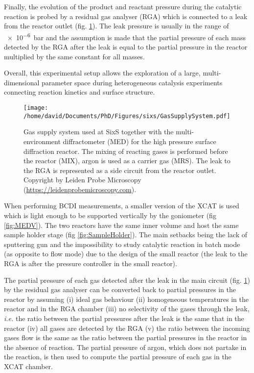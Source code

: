 Finally, the evolution of the product and reactant pressure during the catalytic reaction is probed by a residual gas analyser (RGA) which is connected to a leak from the reactor outlet (fig. \ref{fig:GasSupplySystem}).
The leak pressure is usually in the range of \qty{e-6}{\bar} and the assumption is made that the partial pressure of each mass detected by the RGA after the leak is equal to the partial pressure in the reactor multiplied by the same constant for all masses.

Overall, this experimental setup allows the exploration of a large, multi-dimensional parameter space during heterogeneous catalysis experiments connecting reaction kinetics and surface structure.

\begin{figure}[!htb]
    \centering
    \texttt{[image: /home/david/Documents/PhD/Figures/sixs/GasSupplySystem.pdf]}
    \caption{
    	Gas supply system used at SixS together with the multi-environment diffractometer (MED) for the high pressure surface diffraction reactor.
    	The mixing of reacting gases is performed before the reactor (MIX), argon is used as a carrier gas (MRS).
    	The leak to the RGA is represented as a side circuit from the reactor outlet.
    	Copyright by Leiden Probe Microscopy (\url{https://leidenprobemicroscopy.com}).
    }
    \label{fig:GasSupplySystem}
\end{figure}

When performing BCDI measurements, a smaller version of the XCAT is used which is light enough to be supported vertically by the goniometer (fig \ref{fig:MEDV}).
The two reactors have the same inner volume and host the same sample holder stage (fig \ref{fig:SampleHolder}).
The main setbacks being the lack of sputtering gun and the impossibility to study catalytic reaction in batch mode (as opposite to flow mode) due to the design of the small reactor (the leak to the RGA is after the pressure controller in the small reactor).

The partial pressure of each gas detected after the leak in the main circuit (fig. \ref{fig:GasSupplySystem}) by the residual gas analyser can be converted back to partial pressures in the reactor by assuming (i) ideal gas behaviour (ii) homogeneous temperatures in the reactor and in the RGA chamber (iii) no selectivity of the gases through the leak, \textit{i.e.} the ratio between the partial pressures after the leak is the same that in the reactor (iv) all gases are detected by the RGA (v) the ratio between the incoming gases flow is the same as the ratio between the partial pressures in the reactor in the absence of reaction.
The partial pressure of argon, which does not partake in the reaction, is then used to compute the partial pressure of each gas in the XCAT chamber.

